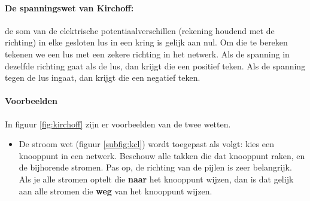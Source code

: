 \documentclass{article}
\begin{document}
\paragraph*{De spanningswet van Kirchoff:} de som van de elektrische potentiaalverschillen (rekening houdend met de richting) in elke gesloten lus in een kring is gelijk aan nul. Om die te bereken tekenen we een lus met een zekere richting in het netwerk. Als de spanning in dezelfde richting gaat als de lus, dan krijgt die een positief teken. Als de spanning tegen de lus ingaat, dan krijgt die een negatief teken.

\paragraph*{Voorbeelden} In figuur \ref{fig:kirchoff} zijn er voorbeelden van de twee wetten.

\begin{itemize}
	\item De stroom wet (figuur \ref{subfig:kcl}) wordt toegepast als volgt: kies een knooppunt in een netwerk. Beschouw alle takken die dat knooppunt raken, en de bijhorende stromen. Pas op, de richting van de pijlen is zeer belangrijk. Als je alle stromen optelt die \textbf{naar} het knooppunt wijzen, dan is dat gelijk aan alle stromen die \textbf{weg} van het knooppunt wijzen.
\end{itemize}
\end{document}
